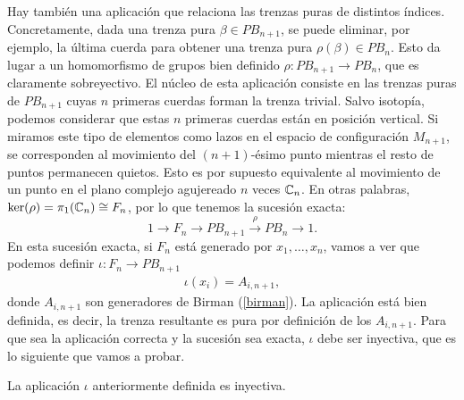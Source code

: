 \documentclass[TFG.tex]{subfiles}
\begin{document}
Hay también una aplicación que relaciona las trenzas puras de distintos índices. Concretamente, dada una trenza pura $\beta\in PB_{n+1}$, se puede eliminar, por ejemplo, la última cuerda para obtener una trenza pura $\rho(\beta)\in PB_n$. Esto da lugar a un homomorfismo de grupos bien definido $\rho: PB_{n+1}\to PB_n$, que es claramente sobreyectivo. El núcleo de esta aplicación consiste en las trenzas puras de $PB_{n+1}$ cuyas $n$ primeras cuerdas forman la trenza trivial. Salvo isotopía, podemos considerar que estas $n$ primeras cuerdas están en posición vertical. Si miramos este tipo de elementos como lazos en el espacio de configuración $M_{n+1}$, se corresponden al movimiento del $(n+1)$-ésimo punto mientras el resto de puntos permanecen quietos. Esto es por supuesto equivalente al movimiento de un punto en el plano complejo agujereado $n$ veces $\mathbb{C}_n$. En otras palabras, $\ker(\rho)=\pi_1(\mathbb{C}_n)\cong F_n$, por lo que tenemos la sucesión exacta:
\begin{equation}\label{pure}
1\to F_n \to PB_{n+1}\overset{\rho}{\to} PB_n\to 1.
\end{equation} 
En esta sucesión exacta, si $F_n$ está generado por $x_1,\dots, x_n$, vamos a ver que podemos definir $\iota: F_n\to PB_{n+1}$
\begin{gather*}
\iota(x_i)=A_{i,n+1},
\end{gather*}
donde $A_{i,n+1}$ son generadores de Birman (\ref{birman}). La aplicación está bien definida, es decir, la trenza resultante es pura por definición de los $A_{i,n+1}$. Para que sea la aplicación correcta y la sucesión sea exacta, $\iota$ debe ser inyectiva, que es lo siguiente que vamos a probar.
\begin{prop}\label{split}
La aplicación $\iota$ anteriormente definida es inyectiva.
\end{prop}
\end{document}

